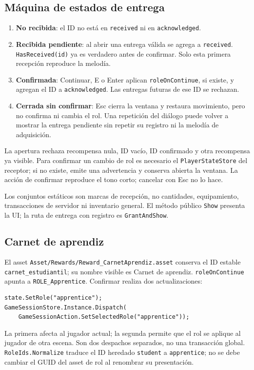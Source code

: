 \documentclass[11pt,letterpaper,oneside]{article}
\newcommand{\code}[1]{\nolinkurl{#1}}
\begin{document}
\subsection{Máquina de estados de entrega}
\begin{enumerate}
\item \textbf{No recibida}: el ID no está en \code{received} ni en \code{acknowledged}.
\item \textbf{Recibida pendiente}: al abrir una entrega válida se agrega a \code{received}. \code{HasReceived(id)} ya es verdadero antes de confirmar. Solo esta primera recepción reproduce la melodía.
\item \textbf{Confirmada}: Continuar, E o Enter aplican \code{roleOnContinue}, si existe, y agregan el ID a \code{acknowledged}. Las entregas futuras de ese ID se rechazan.
\item \textbf{Cerrada sin confirmar}: Esc cierra la ventana y restaura movimiento, pero no confirma ni cambia el rol. Una repetición del diálogo puede volver a mostrar la entrega pendiente sin repetir su registro ni la melodía de adquisición.
\end{enumerate}
La apertura rechaza recompensa nula, ID vacío, ID confirmado y otra recompensa ya visible. Para confirmar un cambio de rol es necesario el \code{PlayerStateStore} del receptor; si no existe, emite una advertencia y conserva abierta la ventana. La acción de confirmar reproduce el tono corto; cancelar con Esc no lo hace.

Los conjuntos estáticos son marcas de recepción, no cantidades, equipamiento, transacciones de servidor ni inventario general. El método público \code{Show} presenta la UI; la ruta de entrega con registro es \code{GrantAndShow}.

\subsection{Carnet de aprendiz}
El asset \code{Asset/Rewards/Reward_CarnetAprendiz.asset} conserva el ID estable \code{carnet_estudiantil}; su nombre visible es Carnet de aprendiz. \code{roleOnContinue} apunta a \code{ROLE_Apprentice}. Confirmar realiza dos actualizaciones:
\begin{lstlisting}
state.SetRole("apprentice");
GameSessionStore.Instance.Dispatch(
    GameSessionAction.SetSelectedRole("apprentice"));
\end{lstlisting}
La primera afecta al jugador actual; la segunda permite que el rol se aplique al jugador de otra escena. Son dos despachos separados, no una transacción global. \code{RoleIds.Normalize} traduce el ID heredado \code{student} a \code{apprentice}; no se debe cambiar el GUID del asset de rol al renombrar su presentación.
\end{document}
